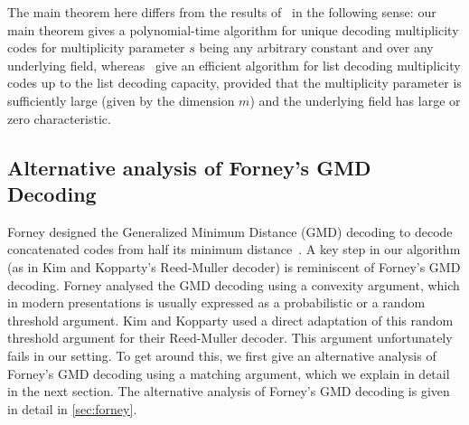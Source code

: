 \documentclass{theoretics}
\begin{document}
	The main theorem here differs from the results of~\cite{BhandariHKS2021-mgrid} in the following sense: our main theorem gives a polynomial-time algorithm for unique decoding multiplicity codes for multiplicity parameter $s$ being any arbitrary constant and over any underlying field, whereas~\cite{BhandariHKS2021-mgrid} give an efficient algorithm for list decoding multiplicity codes up to the list decoding capacity, provided that the multiplicity parameter is sufficiently large (given by the dimension $m$) and the underlying field has large or zero characteristic. 
	
	\subsection{Alternative analysis of Forney's GMD Decoding}
	
	Forney designed the Generalized Minimum Distance (GMD) decoding to
	decode concatenated codes from half its minimum distance~\cite{Forney1965, Forney1966}. A key step in
	our algorithm (as in Kim and Kopparty's Reed-Muller decoder) is
	reminiscent of Forney's GMD decoding. Forney analysed the GMD decoding
	using a convexity argument, which in modern presentations is usually
	expressed as a probabilistic or a random threshold argument.  Kim and Kopparty used a direct adaptation
	of this random threshold argument for their Reed-Muller decoder. This
	argument unfortunately fails in our setting. To get
	around this, we first give an alternative analysis of Forney's GMD
	decoding using a matching argument, which we explain in detail in the next section. The alternative
	analysis of Forney's GMD decoding is given in detail in \cref{sec:forney}. 
	
	
\end{document}
